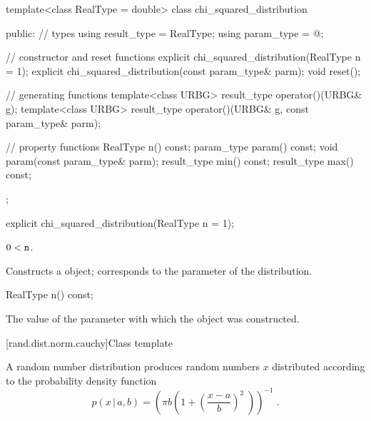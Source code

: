 %
\begin{codeblock}
template<class RealType = double>
  class chi_squared_distribution {
  public:
    // types
    using result_type = RealType;
    using param_type  = @\unspec@;

    // constructor and reset functions
    explicit chi_squared_distribution(RealType n = 1);
    explicit chi_squared_distribution(const param_type& parm);
    void reset();

    // generating functions
    template<class URBG>
      result_type operator()(URBG& g);
    template<class URBG>
      result_type operator()(URBG& g, const param_type& parm);

    // property functions
    RealType n() const;
    param_type param() const;
    void param(const param_type& parm);
    result_type min() const;
    result_type max() const;
  };
\end{codeblock}


%
\begin{itemdecl}
explicit chi_squared_distribution(RealType n = 1);
\end{itemdecl}

\begin{itemdescr}
\pnum\requires
 $ 0 < \texttt{n} $.

\pnum\effects Constructs a  object;
 corresponds to the parameter of the distribution.
\end{itemdescr}

%
\begin{itemdecl}
RealType n() const;
\end{itemdecl}

\begin{itemdescr}
\pnum\returns The value of the  parameter
 with which the object was constructed.
\end{itemdescr}


[rand.dist.norm.cauchy]{Class template }%
%
%

\pnum
A  random number distribution
produces random numbers $x$
distributed according to
the probability density function%
%
%
\[%
 p(x\,|\,a,b)
      = \left( \pi b \left( 1 + \left( \frac{x-a}{b}  \right)^2 \;\right)\right)^{-1}
\; \mbox{.}
\]


